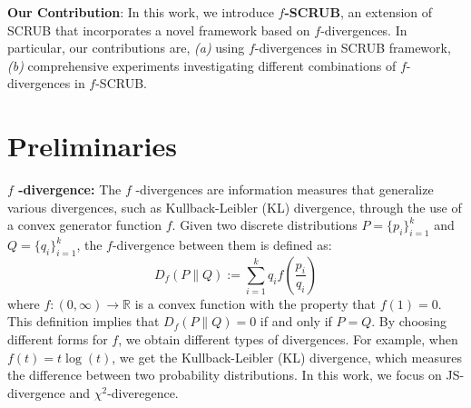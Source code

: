 \documentclass{article} %
\begin{document}
\textbf{Our Contribution}:
 In this work, we introduce \textbf{${f}$-SCRUB}, an extension of SCRUB that incorporates a novel framework based on $f$-divergences. In particular, our contributions are, \textit{(a)} using $f$-divergences in SCRUB framework, \textit{(b)} comprehensive experiments investigating different combinations of $f$-divergences in $f$-SCRUB.
\vspace{-0.1in}
\section{Preliminaries}
\vspace{-0.1in}
\textbf{$f$ -\textbf{divergence}:} The $f$ -divergences are information measures that generalize various divergences, such as Kullback-Leibler (KL) divergence, through the use of a convex generator function $f$. Given two discrete distributions $P = \{p_i\}_{i=1}^{k}$ and $Q = \{q_i\}_{i=1}^{k}$, the $f$-divergence between them is defined as:
\[
D_f(P \parallel Q) := \sum_{i=1}^{k} q_i f\left( \frac{p_i}{q_i} \right)
\]
where $f: (0, \infty) \to \mathbb{R}$ is a convex function with the property that $f(1) = 0$. This definition implies that $D_f(P \parallel Q) = 0$ if and only if $P = Q$. By choosing different forms for $f$, we obtain different types of divergences. For example, when $f(t) = t \log(t)$, we get the Kullback-Leibler (KL) divergence, which measures the difference between two probability distributions. In this work, we focus on JS-divergence and $\chi^2$-diveregence.

\begin{table*}[t]
    \centering
    \setlength{\tabcolsep}{10pt} %
    \renewcommand{\arraystretch}{1.3} %
    \caption{Divergences and their corresponding generator functions}
    \label{tab:divergences}
\end{table*}
\end{document}
